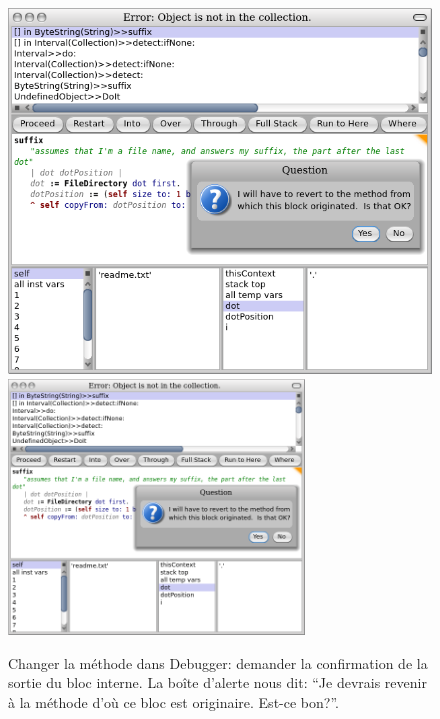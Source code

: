\documentclass[a4paper,10pt,twoside]{book}
\begin{document}
\begin{figure}[btp]
 	\begin{center}
 	\ifluluelse
 		{\includegraphics[width=\textwidth]{revertDialog}}
 		{\includegraphics[width=0.7\textwidth]{revertDialog}}
 	\end{center}
 	\caption{Changer la méthode  dans Debugger: demander
      la confirmation de la sortie du bloc interne. La boîte
      d'alerte nous dit: ``Je devrais revenir à la méthode d'où ce bloc est originaire. Est-ce bon?''. }
 \end{figure}
\end{document}
